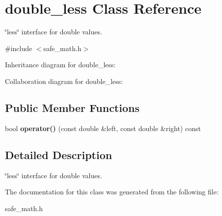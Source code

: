 \section{double\+\_\+less Class Reference}
\label{classdouble__less}


\char`\"{}less\char`\"{} interface for double values.  




{\ttfamily \#include $<$safe\+\_\+math.\+h$>$}



Inheritance diagram for double\+\_\+less\+:


Collaboration diagram for double\+\_\+less\+:
\subsection*{Public Member Functions}
\begin{DoxyCompactItemize}
\item 
bool {\bfseries operator()} (const double \&left, const double \&right) const 
\end{DoxyCompactItemize}


\subsection{Detailed Description}
\char`\"{}less\char`\"{} interface for double values. 

The documentation for this class was generated from the following file\+:\begin{DoxyCompactItemize}
\item 
safe\+\_\+math.\+h\end{DoxyCompactItemize}
